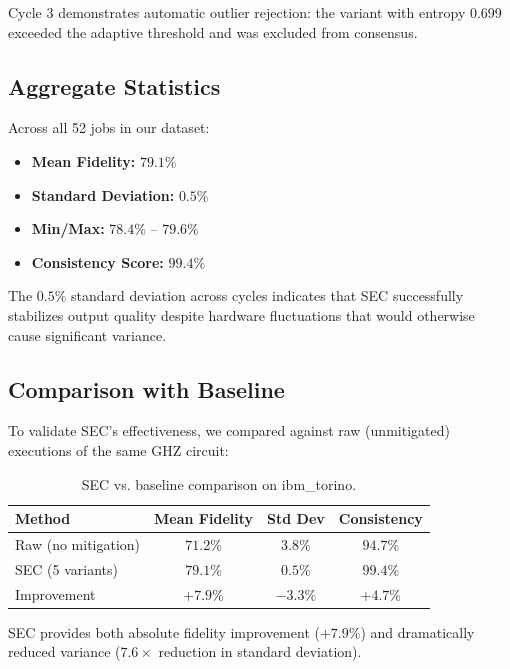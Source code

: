 \documentclass[twocolumn,preprintnumbers,amsmath,amssymb,prl]{revtex4-2}
\begin{document}
Cycle 3 demonstrates automatic outlier rejection: the variant with entropy 0.699 exceeded the adaptive threshold and was excluded from consensus.

\subsection{Aggregate Statistics}

Across all 52 jobs in our dataset:

\begin{itemize}
\item \textbf{Mean Fidelity:} $79.1\%$
\item \textbf{Standard Deviation:} $0.5\%$
\item \textbf{Min/Max:} $78.4\%$ -- $79.6\%$
\item \textbf{Consistency Score:} $99.4\%$
\end{itemize}

The $0.5\%$ standard deviation across cycles indicates that SEC successfully stabilizes output quality despite hardware fluctuations that would otherwise cause significant variance.

\subsection{Comparison with Baseline}

To validate SEC's effectiveness, we compared against raw (unmitigated) executions of the same GHZ circuit:

\begin{table}[h]
\caption{SEC vs. baseline comparison on ibm\_torino.}
\label{tab:baseline}
\begin{ruledtabular}
\begin{tabular}{lccc}
Method & Mean Fidelity & Std Dev & Consistency \\
\hline
Raw (no mitigation) & $71.2\%$ & $3.8\%$ & $94.7\%$ \\
SEC (5 variants) & $79.1\%$ & $0.5\%$ & $99.4\%$ \\
\hline
Improvement & $+7.9\%$ & $-3.3\%$ & $+4.7\%$ \\
\end{tabular}
\end{ruledtabular}
\end{table}

SEC provides both absolute fidelity improvement ($+7.9\%$) and dramatically reduced variance ($7.6\times$ reduction in standard deviation).
\end{document}
